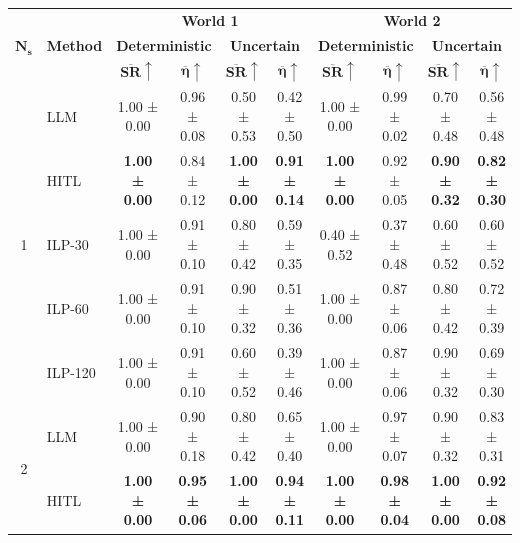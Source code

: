 \setlength{\tabcolsep}{2.4pt}
\begin{table}[t]
\centering
\scriptsize
\begin{tabular}{cl|cc|cc|cc|cc}
\toprule
\multirow{3}{*}{\textbf{$\boldsymbol{N_s}$}} & \multirow{3}{*}{\textbf{Method}} & \multicolumn{4}{c|}{\textbf{World 1}} & \multicolumn{4}{c}{\textbf{World 2}} \\
\cmidrule(lr){3-6} \cmidrule(lr){7-10}
 & & \multicolumn{2}{c|}{\textbf{Deterministic}} & \multicolumn{2}{c|}{\textbf{Uncertain}} & \multicolumn{2}{c|}{\textbf{Deterministic}} & \multicolumn{2}{c}{\textbf{Uncertain}} \\
\cmidrule(lr){3-4} \cmidrule(lr){5-6} \cmidrule(lr){7-8} \cmidrule(lr){9-10}
 & & $\mathbf{\overline{SR}\uparrow}$ & $\mathbf{\overline{\eta}\uparrow}$ & $\mathbf{\overline{SR}\uparrow}$ & $\mathbf{\overline{\eta}\uparrow}$ & $\mathbf{\overline{SR}\uparrow}$ & $\mathbf{\overline{\eta}\uparrow}$ & $\mathbf{\overline{SR}\uparrow}$ & $\mathbf{\overline{\eta}\uparrow}$ \\
\midrule
\multirow{5}{*}{1} & LLM & 1.00 ± 0.00 & 0.96 ± 0.08 & 0.50 ± 0.53 & 0.42 ± 0.50 & 1.00 ± 0.00 & 0.99 ± 0.02 & 0.70 ± 0.48 & 0.56 ± 0.48 \\
 & \cellcolor{green!20}HITL & \textbf{\cellcolor{green!20}1.00 ± 0.00} & \cellcolor{green!20}0.84 ± 0.12 & \textbf{\cellcolor{green!20}1.00 ± 0.00} & \textbf{\cellcolor{green!20}0.91 ± 0.14} & \textbf{\cellcolor{green!20}1.00 ± 0.00} & \cellcolor{green!20}0.92 ± 0.05 & \textbf{\cellcolor{green!20}0.90 ± 0.32} & \textbf{\cellcolor{green!20}0.82 ± 0.30} \\
 & ILP-30 & 1.00 ± 0.00 & 0.91 ± 0.10 & 0.80 ± 0.42 & 0.59 ± 0.35 & 0.40 ± 0.52 & 0.37 ± 0.48 & 0.60 ± 0.52 & 0.60 ± 0.52 \\
 & ILP-60 & 1.00 ± 0.00 & 0.91 ± 0.10 & 0.90 ± 0.32 & 0.51 ± 0.36 & 1.00 ± 0.00 & 0.87 ± 0.06 & 0.80 ± 0.42 & 0.72 ± 0.39 \\
 & ILP-120 & 1.00 ± 0.00 & 0.91 ± 0.10 & 0.60 ± 0.52 & 0.39 ± 0.46 & 1.00 ± 0.00 & 0.87 ± 0.06 & 0.90 ± 0.32 & 0.69 ± 0.30 \\
\hline
\multirow{5}{*}{2} & LLM & 1.00 ± 0.00 & 0.90 ± 0.18 & 0.80 ± 0.42 & 0.65 ± 0.40 & 1.00 ± 0.00 & 0.97 ± 0.07 & 0.90 ± 0.32 & 0.83 ± 0.31 \\
 & \cellcolor{green!20}HITL & \textbf{\cellcolor{green!20}1.00 ± 0.00} & \textbf{\cellcolor{green!20}0.95 ± 0.06} & \textbf{\cellcolor{green!20}1.00 ± 0.00} & \textbf{\cellcolor{green!20}0.94 ± 0.11} & \textbf{\cellcolor{green!20}1.00 ± 0.00} & \textbf{\cellcolor{green!20}0.98 ± 0.04} & \textbf{\cellcolor{green!20}1.00 ± 0.00} & \textbf{\cellcolor{green!20}0.92 ± 0.08} \\

\end{tabular}
\end{table}

